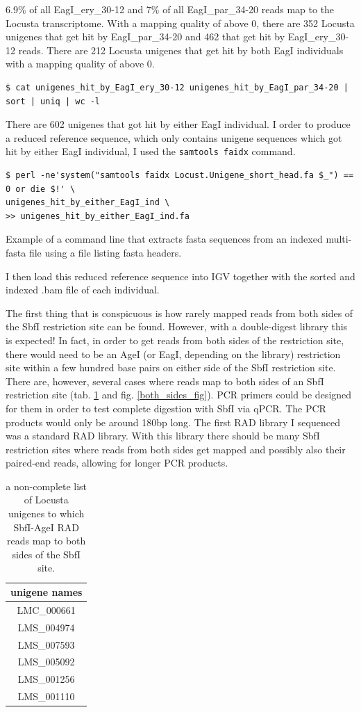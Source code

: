 \documentclass{article}\usepackage[]{graphicx}\usepackage[]{color}
\begin{document}
6.9\% of all EagI\_ery\_30-12 and 7\% of all EagI\_par\_34-20 reads map to the Locusta transcriptome. With a mapping quality of above 0, there are 352 Locusta unigenes that get hit by EagI\_par\_34-20  and 462 that get hit by EagI\_ery\_30-12 reads. There are 212 Locusta unigenes that get hit by both EagI individuals with a mapping quality of above 0.
\begin{Verbatim}
$ cat unigenes_hit_by_EagI_ery_30-12 unigenes_hit_by_EagI_par_34-20 | sort | uniq | wc -l
\end{Verbatim}
There are 602 unigenes that got hit by either EagI individual. I order to produce a reduced reference sequence, which only contains unigene sequences which got hit by either EagI individual, I used the \texttt{samtools faidx} command.
\begin{command}
\captionsetup{type=command}
\begin{Verbatim}
$ perl -ne'system("samtools faidx Locust.Unigene_short_head.fa $_") == 0 or die $!' \
unigenes_hit_by_either_EagI_ind \
>> unigenes_hit_by_either_EagI_ind.fa
\end{Verbatim}
\caption{Example of a command line that extracts fasta sequences from an indexed multi-fasta file using a file listing fasta headers.}
\label{reduced_reference}
\end{command}
I then load this reduced reference sequence into IGV together with the sorted and indexed .bam file of each individual.

The first thing that is conspicuous is how rarely mapped reads from both sides of the SbfI restriction site can be found. However, with a double-digest library this is expected! In fact, in order to get reads from both sides of the restriction site, there would need to be an AgeI (or EagI, depending on the library) restriction site within a few hundred base pairs on either side of the SbfI restriction site. There are, however, several cases where reads map to both sides of an SbfI restriction site (tab. \ref{both_sides_tab} and fig. \ref{both_sides_fig}). PCR primers could be designed for them in order to test complete digestion with SbfI via qPCR. The PCR products would only be around 180bp long. The first RAD library I sequenced was a standard RAD library. With this library there should be many SbfI restriction sites where reads from both sides get mapped and possibly also their paired-end reads, allowing for longer PCR products. 

\begin{table}[b]
\centering
\caption{a non-complete list of Locusta unigenes to which SbfI-AgeI RAD reads map to both sides of the SbfI site.}
\begin{tabular}{c}
\toprule
unigene names\\
\midrule
LMC\_000661\\
LMS\_004974\\
LMS\_007593\\
LMS\_005092\\
LMS\_001256\\
LMS\_001110\\
\bottomrule
\end{tabular}
\label{both_sides_tab}
\end{table}
\end{document}
